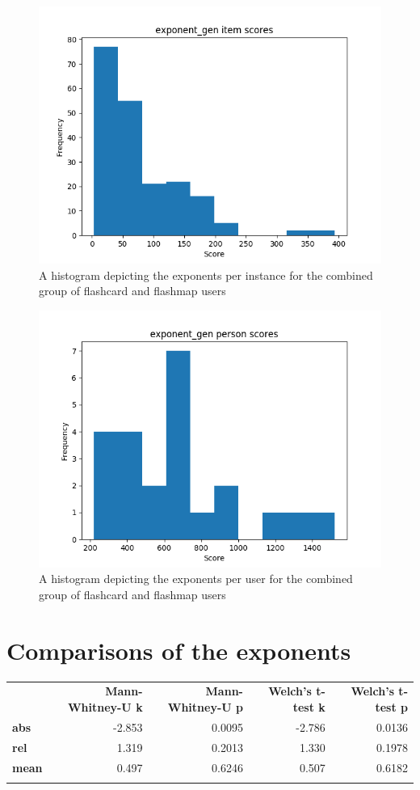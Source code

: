\begin{figure}
    \centering
    \includegraphics[width=.7\textwidth]{img/exponent_gen_diff.png}
    \caption{A histogram depicting the exponents per instance for the combined group of flashcard and flashmap users}
    \label{fig:exponent_gen_diff}
\end{figure}
\begin{figure}
    \centering
    \includegraphics[width=.7\textwidth]{img/exponent_gen_abil.png}
    \caption{A histogram depicting the exponents per user for the combined group of flashcard and flashmap users}
    \label{fig:exponent_gen_abil}
\end{figure}

\section{Comparisons of the exponents}

\begin{longtable}[c]{@{}lrrrr@{}}
\toprule\addlinespace
& \textbf{Mann-Whitney-U k} & \textbf{Mann-Whitney-U p} &
\textbf{Welch's t-test k} & \textbf{Welch's t-test p}
\\\addlinespace
\midrule\endhead
\textbf{abs} & -2.853 & 0.0095 & -2.786 & 0.0136
\\\addlinespace
\textbf{rel} & 1.319 & 0.2013 & 1.330 & 0.1978
\\\addlinespace
\textbf{mean} & 0.497 & 0.6246 & 0.507 & 0.6182
\\\addlinespace
\bottomrule
    \label{tab:exponent_comp}
\end{longtable}

